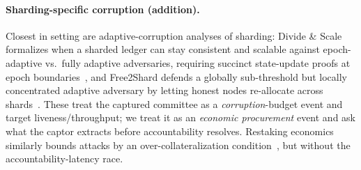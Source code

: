 
\paragraph{Sharding-specific corruption (addition).}
Closest in setting are adaptive-corruption analyses of sharding: Divide \& Scale formalizes when a
sharded ledger can stay consistent and scalable against epoch-adaptive vs.\ fully adaptive
adversaries, requiring succinct state-update proofs at epoch boundaries~\cite{avarikioti2019divide}, and
Free2Shard defends a globally sub-threshold but locally concentrated adaptive adversary by letting honest
nodes re-allocate across shards~\cite{rana2022free2shard}. These treat the captured committee as a
\emph{corruption}-budget event and target liveness/throughput; we treat it as an \emph{economic
procurement} event and ask what the captor extracts before accountability resolves. Restaking economics
similarly bounds attacks by an over-collateralization condition~\cite{durvasula2025restaking}, but
without the accountability-latency race.



